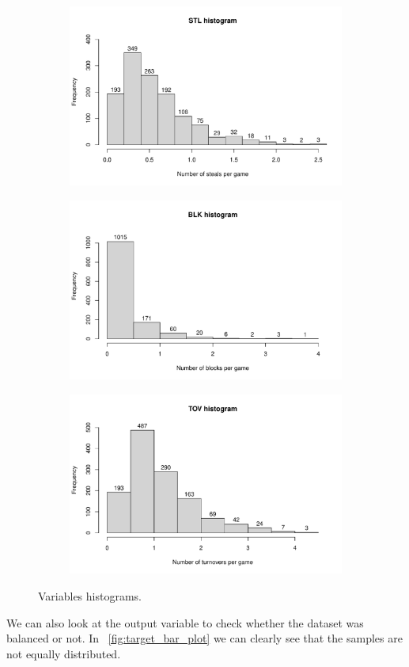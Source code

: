 \begin{figure}[H]
\begin{subfigure}{.3\textwidth}
		\caption{}
		\label{fig:HistAST}
	\end{subfigure}%
	\begin{subfigure}{.3\textwidth}
		\centering
		\includegraphics[width=0.5\linewidth]{ImageFiles/Histograms/histogram_stl.pdf}
		\caption{}
		\label{fig:HistSTL}
	\end{subfigure}%
	\begin{subfigure}{.3\textwidth}
		\centering
		\includegraphics[width=0.5\linewidth]{ImageFiles/Histograms/histogram_blk.pdf}
		\caption{}
		\label{fig:HistBLK}
	\end{subfigure}
	\begin{subfigure}{.3\textwidth}
		\centering
		\includegraphics[width=0.5\linewidth]{ImageFiles/Histograms/histogram_tov.pdf}
		\caption{}
		\label{fig:HistTOV}
	\end{subfigure}
	\caption{Variables histograms.}
	\label{fig:Histograms}
\end{figure}

We can also look at the output variable to check whether the dataset was balanced or not. In \Fig~\ref{fig:target_bar_plot} we can clearly see that the samples are not equally distributed. 

